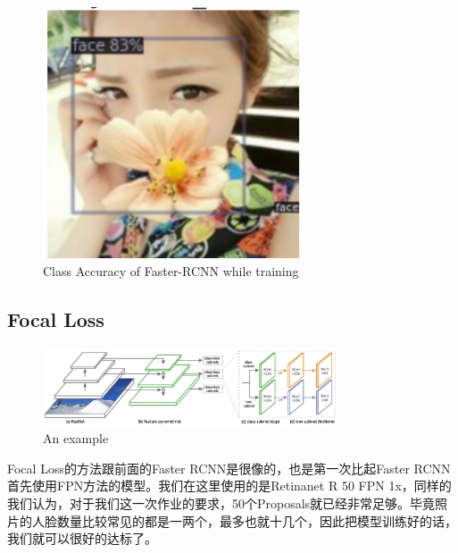 \documentclass[journal,transmag]{IEEEtran}
\begin{document}
\begin{figure}[h]
\centering
\includegraphics[width=3in]{b.png}
\caption{Class Accuracy of Faster-RCNN while training}
\end{figure}


\subsection{Focal Loss}
\begin{figure}[h]
\centering
\includegraphics[width=3.44in]{c.bmp}
\caption{An example}
\end{figure}

Focal Loss的方法跟前面的Faster RCNN是很像的，也是第一次比起Faster RCNN首先使用FPN方法的模型。我们在这里使用的是Retinanet R 50 FPN 1x，同样的我们认为，对于我们这一次作业的要求，50个Proposals就已经非常足够。毕竟照片的人脸数量比较常见的都是一两个，最多也就十几个，因此把模型训练好的话，我们就可以很好的达标了。
\end{document}
